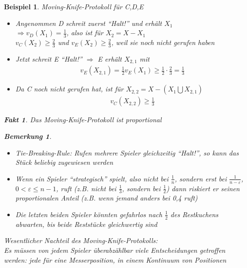 \documentclass[a4paper,10pt]{scrartcl}
\newtheorem*{bemerkung*}{Bemerkung}
\newtheorem*{fakt}{Fakt}
\newtheorem*{beispiel}{Beispiel}
\begin{document}
 \begin{beispiel}Moving-Knife-Protokoll für C,D,E
  \begin{itemize}
   \item[] Angenommen D schreit zuerst ``Halt!'' und erhält $X_1$\\
           $\Rightarrow v_D(X_1)=\frac{1}{3}$, also ist für $X_2=X-X_1$\\
           $v_C(X_2)\geq\frac{2}{3}$ und $v_E(X_2)\geq\frac{2}{3}$, weil sie noch nicht gerufen haben
   \item[] Jetzt schreit E ``Halt!'' $\Rightarrow$ E erhält $X_{2,1}$ mit
           \begin{align*}
            v_E(X_{2,1})=\frac{1}{2}v_E(X_1)\geq\frac{1}{2}\cdot\frac{2}{3}=\frac{1}{3}
           \end{align*}
   \item[] Da C noch nicht gerufen hat, ist für $X_{2,2}=X-(X_1\bigcup\limits X_{2,1})$
           \begin{align*}
            v_C(X_{2,2})\geq\frac{1}{3}
           \end{align*}
  \end{itemize}
  \begin{fakt}
   Das Moving-Knife-Protokoll ist proportional
  \end{fakt}
  \begin{bemerkung*}
   \begin{itemize}
    \item Tie-Breaking-Rule: Rufen mehrere Spieler gleichzeitig ``Halt!'', so kann das Stück beliebig zugewiesen werden
    \item Wenn ein Spieler ``strategisch'' spielt, also nicht bei $\frac{1}{n}$, sondern erst bei $\frac{1}{n-\varepsilon}$,
          $0<\varepsilon\leq n-1$, ruft (z.B. nicht bei $\frac{1}{3}$, sondern bei $\frac{1}{2}$) dann riskiert er seinen
          proportionalen Anteil (z.B. wenn jemand anders bei 0,4 ruft)
    \item Die letzten beiden Spieler könnten gefahrlos nach $\frac{1}{2}$ des Restkuchens abwarten, bis beide Reststücke gleichwertig sind
   \end{itemize}
  \end{bemerkung*}
  Wesentlicher Nachteil des Moving-Knife-Protokolls:\\
  Es müssen von jedem Spieler überabzählbar viele Entscheidungen getroffen werden: jede für eine Messerposition, in einem Kontinuum von 
  Positionen
 \end{beispiel}

\end{document}
